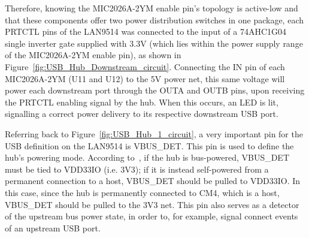 Therefore, knowing the MIC2026A-2YM enable pin's topology is active-low and that these components offer two power distribution switches in one package, each PRTCTL pins of the LAN9514 was connected to the input of a 74AHC1G04 single inverter gate supplied with 3.3V (which lies within the power supply range of the MIC2026A-2YM enable pin), as shown in Figure~\ref{fig:USB_Hub_Downstream_circuit}. Connecting the IN pin of each MIC2026A-2YM (U11 and U12) to the 5V power net, this same voltage will power each downstream port through the OUTA and OUTB pins, upon receiving the PRTCTL enabling signal by the hub. When this occurs, an LED is lit, signalling a correct power delivery to its respective downstream USB port.

Referring back to Figure~\ref{fig:USB_Hub_1_circuit}, a very important pin for the USB definition on the LAN9514 is VBUS\_DET. This pin is used to define the hub's powering mode.
According to~\cite{LAN9514}, if the hub is bus-powered, VBUS\_DET must be tied to VDD33IO (i.e. 3V3); if it is instead self-powered from a permanent connection to a host, VBUS\_DET should be pulled to VDD33IO. In this case, since the hub is permanently connected to CM4, which is a host, VBUS\_DET should be pulled to the 3V3 net. This pin also serves as a detector of the upstream bus power state, in order to, for example, signal connect events of an upstream USB port.	






